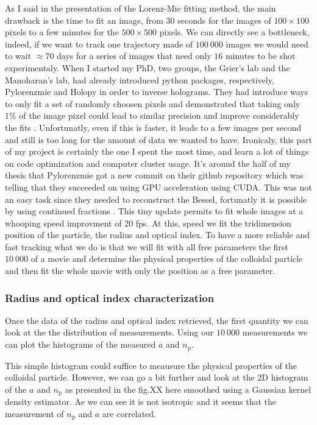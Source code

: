 As I said in the presentation of the Lorenz-Mie fitting method, the main drawback is the time to fit an image, from $30$ seconds for the images of $100 \times 100$ pixels to a few minutes for the $500\times 500$ pixels. We can directly see a bottleneck, indeed, if we want to track one trajectory made of $100~000$ images we would need to wait $\approx 70$ days for a series of images that need only $16$ minutes to be shot experimentaly. When I started my PhD, two groups, the Grier's lab and the Manoharan's lab, had already introduced python packages, respectively, Pylorenzmie and Holopy in order to inverse holograms. They had introduce ways to only fit a set of randomly choosen pixels and demonstrated that taking only $1\%$ of the image pixel could lead to similar precision and improve considerably the fits \cite{dimiduk_random-subset_2014}. Unfortunatly, even if this is faster, it leads to a few images per second and still is too long for the amount of data we wanted to have. Ironicaly, this part of my project is certainly the one I spent the most time, and learn a lot of things on code optimization and computer cluster usage. It's around the half of my thesis that Pylorenzmie got a new commit on their github repository which was telling that they succeeded on using GPU acceleration using CUDA. This was not an easy task since they needed to reconstruct the Bessel, fortunatly it is possible by using continued fractions \cite{lentz_generating_1976}. This tiny update permits to fit whole images at a whooping speed improvment of 20 fps. At this, speed we fit the tridimension position of the particle, the radius and optical index. To have a more reliable and fast tracking what we do is that we will fit with all free parameters the first $10~000$ of a movie and determine the physical properties of the colloidal particle and then fit the whole movie with only the position as a free parameter.

\subsubsection{Radius and optical index characterization}


Once the data of the radius and optical index retrieved, the first quantity we can look at the the distribution of measurements. Using our $10 ~ 000$ measurements we can plot the histograms of the measured $a$ and $n_\mathrm{p}$.




This simple histogram could suffice to meausure the physical properties of the colloidal particle. However, we can go a bit further and look at the 2D histogram of the $a$ and $n_\mathrm{p}$ as presented in the fig.XX here smoothed using a Gaussian kernel density estimator. Ae we can see it is not isotropic and it seems that the measurement of $n_\mathrm{p}$ and $a$ are correlated.
 


